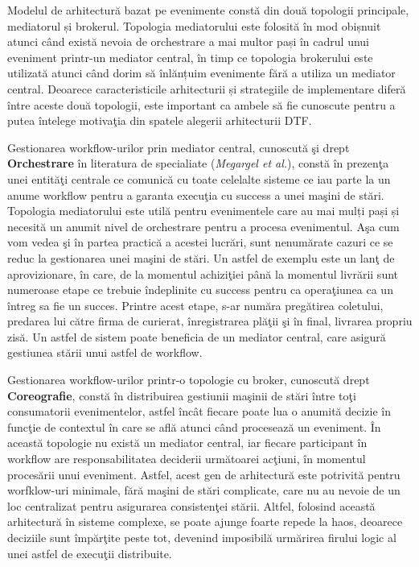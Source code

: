 Modelul de arhitectură bazat pe evenimente constă din două topologii principale, mediatorul și brokerul. Topologia mediatorului este folosită în mod obișnuit atunci când există nevoia de orchestrare a mai multor pași în cadrul unui eveniment printr-un mediator central, în timp ce topologia brokerului este utilizată atunci când dorim să înlănțuim evenimente fără a utiliza un mediator central. Deoarece caracteristicile arhitecturii și strategiile de implementare diferă între aceste două topologii, este important ca ambele să fie cunoscute pentru a putea întelege motivaţia din spatele alegerii arhitecturii DTF. 

\par Gestionarea workflow-urilor prin mediator central, cunoscută şi drept \textbf{Orchestrare} în literatura de specialiate (\emph{Megargel et al.}\cite{megargel2021}), constă în prezenţa unei entităţi centrale ce comunică cu toate celelalte sisteme ce iau parte la un anume workflow pentru a garanta execuţia cu success a unei maşini de stări. Topologia mediatorului este utilă pentru evenimentele care au mai mulți pași și necesită un anumit nivel de orchestrare pentru a procesa evenimentul. Aşa cum vom vedea şi în partea practică a acestei lucrări, sunt nenumărate cazuri ce se reduc la gestionarea unei maşini de stări. Un astfel de exemplu este un lanţ de aprovizionare, în care, de la momentul achiziţiei până la momentul livrării sunt numeroase etape ce trebuie îndeplinite cu success pentru ca operaţiunea ca un întreg sa fie un succes. Printre acest etape, s-ar număra pregătirea coletului, predarea lui către firma de curierat, înregistrarea plăţii şi în final, livrarea propriu zisă. Un astfel de sistem poate beneficia de un mediator central, care asigură gestiunea stării unui astfel de workflow. 
\par Gestionarea workflow-urilor printr-o topologie cu broker, cunoscută drept  \textbf{Coreografie}, constă în distribuirea gestiunii maşinii de stări între toţi consumatorii evenimentelor, astfel încât fiecare poate lua o anumită decizie în funcţie de contextul în care se află atunci când procesează un eveniment. În această topologie nu există un mediator central, iar fiecare participant în workflow are responsabilitatea deciderii următoarei acţiuni, în momentul procesării unui eveniment. Astfel, acest gen de arhitectură este potrivită pentru worfklow-uri minimale, fără maşini de stări complicate, care nu au nevoie de un loc centralizat pentru asigurarea consistenţei stării. Altfel, folosind această arhitectură în sisteme complexe, se poate ajunge foarte repede la haos, deoarece deciziile sunt împărţite peste tot, devenind imposibilă urmărirea firului logic al unei astfel de execuţii distribuite. 
